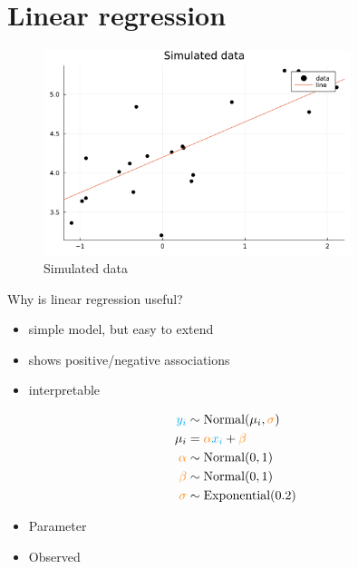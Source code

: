 \documentclass[aspectratio=169,xcolor=svgnames]{beamer}
\begin{document}
\section{Linear regression}

\begin{frame}
\begin{figure}[ht]
  \centering
  \includegraphics[width=0.8\textwidth]{figures/linear_data.pdf}
  \caption{\label{fig:label} Simulated data}
\end{figure}
\end{frame}

\begin{frame}
  \begin{block}{Why is linear regression useful?}
    \begin{itemize}
    \item simple model, but easy to extend
    \item shows positive/negative associations
    \item interpretable
    \end{itemize}
  \end{block}
\end{frame}

\begin{frame}
  \begin{align*}
    \textcolor{cyan}{y_i} &\sim \text{Normal}(\mu_i, \textcolor{orange}{\sigma})\\
    \mu_i &= \textcolor{orange}{\alpha} \textcolor{cyan}{x_i} + \textcolor{orange}{\beta}\\
    \textcolor{orange}{\alpha} &\sim \text{Normal}(0,1)\\
    \textcolor{orange}{\beta} &\sim \text{Normal}(0, 1)\\
    \textcolor{orange}{\sigma} &\sim \text{Exponential}(0.2)\\
  \end{align*}

  \begin{itemize}
  \item {} Parameter
  \item {} Observed
  \end{itemize}
\end{frame}
\end{document}
